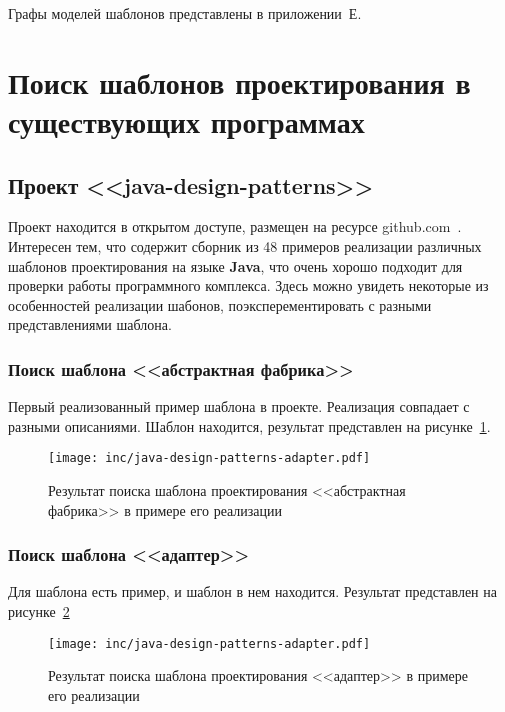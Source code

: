 Графы моделей шаблонов представлены в приложении~Е.

\section{Поиск шаблонов проектирования в существующих программах}

\subsection{Проект <<java-design-patterns>>}

Проект находится в открытом доступе, размещен на ресурсе
github.com~\cite{java-design-patterns}.
Интересен тем, что содержит сборник из 48 примеров реализации различных
шаблонов проектирования на языке \textbf{Java},
что очень хорошо подходит для проверки работы программного комплекса.
Здесь можно увидеть некоторые из особенностей реализации шабонов,
поэксперементировать с разными представлениями шаблона.

\subsubsection*{Поиск шаблона <<абстрактная фабрика>>}

Первый реализованный пример шаблона в проекте.
Реализация совпадает с разными описаниями.
Шаблон находится, результат представлен на рисунке~\ref{fig:java-design-patterns-abstract-factory}.

\begin{figure}[!ht]
\centering
\texttt{[image: inc/java-design-patterns-adapter.pdf]}
\caption{Результат поиска шаблона проектирования <<абстрактная фабрика>> в примере его реализации}
\label{fig:java-design-patterns-abstract-factory}
\end{figure}

\subsubsection*{Поиск шаблона <<адаптер>>}

Для шаблона есть пример, и шаблон в нем находится.
Результат представлен на рисунке~\ref{fig:java-design-patterns-adapter}

\begin{figure}[!ht]
\centering
\texttt{[image: inc/java-design-patterns-adapter.pdf]}
\caption{Результат поиска шаблона проектирования <<адаптер>> в примере его реализации}
\label{fig:java-design-patterns-adapter}
\end{figure}

